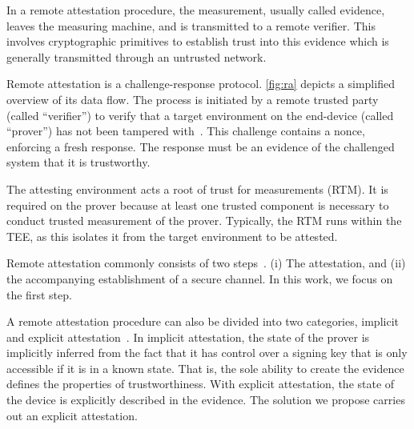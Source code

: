 



In a remote attestation procedure, the measurement, usually called evidence, leaves the measuring machine, and is transmitted to a remote verifier.
This involves cryptographic primitives to establish trust into this evidence which is generally transmitted through an untrusted network.

Remote attestation is a challenge-response protocol.
\autoref{fig:ra} depicts a simplified overview of its data flow.
The process is initiated by a remote trusted party (called ``verifier'') to verify that a target environment on the end-device (called ``prover'') has not been tampered with~\cite{Menetrey2022, Coker2011}.
This challenge contains a nonce, enforcing a fresh response.
The response must be an evidence of the challenged system that it is trustworthy.

The attesting environment acts a root of trust for measurements (RTM).
It is required on the prover because at least one trusted component is necessary to conduct trusted measurement of the prover.
Typically, the RTM runs within the TEE, as this isolates it from the target environment to be attested.

Remote attestation commonly consists of two steps~\cite{McCune2008}.
(i) The attestation, and (ii) the accompanying establishment of a secure channel.
In this work, we focus on the first step.

A remote attestation procedure can also be divided into two categories, implicit and explicit attestation~\cite{dice-layering-arch}.
In implicit attestation, the state of the prover is implicitly inferred from the fact that it has control over a signing key that is only accessible if it is in a known state.
That is, the sole ability to create the evidence defines the properties of trustworthiness.
With explicit attestation, the state of the device is explicitly described in the evidence.
The solution we propose carries out an explicit attestation.

